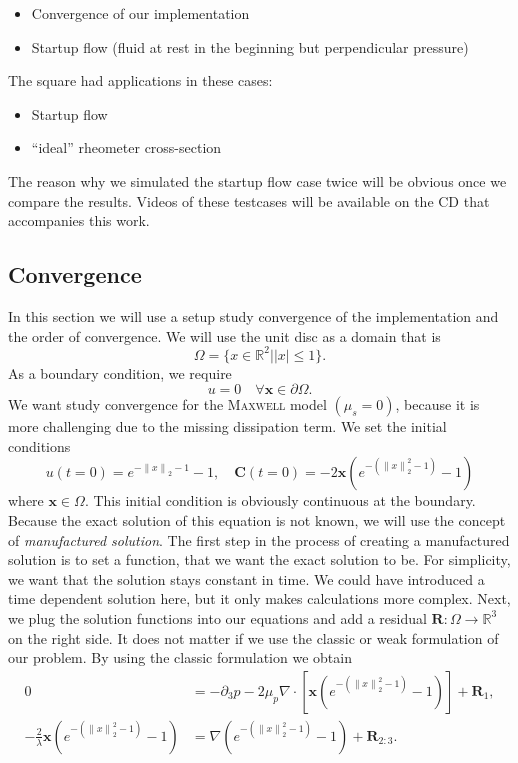 \documentclass[12pt,a4paper,twoside, open=right]{scrreprt}
\theoremstyle{definition}
\theoremstyle{plain}
\newcommand{\abs}[1]{\left\vert #1\right\vert}
\newcommand{\rr}{\mathbb{R}}
\newcommand{\norm}[1]{\left\lVert#1\right\rVert}
\newcommand{\bfC}{\bm{C}}
\newcommand{\bfx}{\bm{x}}
\newcommand{\bfR}{\bm{R}}
\begin{document}
\begin{itemize}
    \item Convergence of our implementation
    \item Startup flow (fluid at rest in the beginning but perpendicular pressure)
\end{itemize}
The square had applications in these cases:
\begin{itemize}
    \item Startup flow
    \item \enquote{ideal} rheometer cross-section
\end{itemize}
The reason why we simulated the startup flow case twice will be obvious once we compare the results. Videos of these testcases will be available on the CD that accompanies this work.
\subsection{Convergence}
In this section we will use a setup study convergence of the implementation and the order of convergence. We will use the unit disc as a domain that is
\begin{equation}
    \Omega =\{x\in\rr^2|\abs{x}\le 1\}.
\end{equation} 
As a boundary condition, we require
\begin{equation}
u = 0\quad\forall\bfx\in\partial\Omega.
\end{equation}
We want study convergence for the \textsc{Maxwell} model $(\mu_s=0)$, because it is more challenging due to the missing dissipation term.
We set the initial conditions
\begin{equation}
u(t=0) = e^{-\norm{x}_2-1}-1,
\quad\bfC(t=0) = -2\bfx(e^{-(\norm{x}_2^2 -1)}-1)
\end{equation}
where $\bfx\in\Omega$. This initial condition is obviously continuous at the boundary. Because the exact solution of this equation is not known, we will use the concept of \emph{manufactured solution}. The first step in the process of creating a manufactured solution is to set a function, that we want the exact solution to be. For simplicity, we want that the solution stays constant in time.  We could have introduced a time dependent solution here, but it only makes calculations more complex. Next, we plug the solution functions into our equations and add a residual $\bfR\colon\Omega\to\rr^3$ on the right side. It does not matter if we use the classic or weak formulation of our problem. By using the classic formulation we obtain
\begin{align}
0 &= -\partial_3 p-2\mu_p \nabla\cdot [\bfx(e^{-(\norm{x}_2^2 -1)}-1)] +\bfR_1,\\
-\frac{2}{\lambda}\bfx(e^{-(\norm{x}_2^2 -1)}-1)&= \nabla (e^{-(\norm{x}_2^2 -1)}-1) +\bfR_{2:3}.
\end{align}
\end{document}
